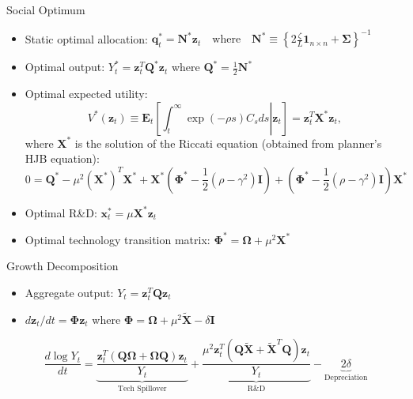 \documentclass[
  10pt,               %
  aspectratio=169,     %
]{beamer}
\theoremstyle{plain}
\begin{document}
\begin{frame}{Social Optimum }

  \label{optimal}
  \begin{itemize}
    \item Static optimal allocation: $\bm{q}_{t}^{*}=\bm{N}^{*}\bm{z}_{t}\quad\text{where}\quad \bm{N}^{*}\equiv\left\{ 2\frac{\zeta}{L}\bm{1}_{n\times n}+\bm{\Sigma}\right\} ^{-1}$
    \item Optimal output: $Y_{t}^{*}=\bm{z}_{t}^{T}\bm{Q}^{*}\bm{z}_{t}$
          where $\bm{Q}^{*}=\frac{1}{2}\bm{N}^{*}$
    \item Optimal expected utility:
          \[
            V^{*}\left(\bm{z}_{t}\right)\equiv\bm{E}_{t}\left[\left.\int_{t}^{\infty}\exp\left(-\rho s\right)C_{s}ds\right|\bm{z}_{t}\right]=\bm{z}_{t}^{T}\bm{X}^{*}\bm{z}_{t},
          \]
          where $\bm{X}^{*}$ is the solution of the Riccati equation (obtained
          from planner's HJB equation):
          \[
            0=\bm{Q}^{*}-\mu^{2}(\bm{X}^*)^T\bm{X}^*+\bm{X}^{*}\left(\bm{\Phi}^{*}-\frac{1}{2}\left(\rho-\gamma^{2}\right)\bm{I}\right)+\left(\bm{\Phi}^{*}-\frac{1}{2}\left(\rho-\gamma^{2}\right)\bm{I}\right)\bm{X}^{*}
          \]
    \item Optimal R\&D: $\bm{x}_{t}^{*}=\mu\bm{X}^{*}\bm{z}_{t}$
    \item Optimal technology transition matrix: $\bm{\Phi}^{*}=\bm{\Omega}+\mu^{2}\bm{X}^{*}$
  \end{itemize}
  \hyperlink{aggregation}{}
\end{frame}

\begin{frame}{Growth Decomposition}
  \begin{itemize}
    \item Aggregate output: $Y_{t}=\bm{z}_{t}^{T}\bm{Q}\bm{z}_{t}$
    \item $d\bm{z}_{t}/dt= \bm{\Phi}\bm{z}_{t}$ where $\bm{\Phi}=\bm{\Omega}+\mu^{2}\bm{\widetilde{X}} - \delta\bm{I}$
  \end{itemize}
  \begin{equation*}
    \frac{d\log Y_{t}}{dt} = \underbrace{\frac{\bm{z}_{t}^{T}\left(\bm{Q}\bm{\Omega}+\bm{\Omega}\bm{Q}\right)\bm{z}_{t}}{Y_{t}}}_{\text{Tech Spillover}} + \underbrace{\frac{\mu^{2}\bm{z}_{t}^{T}\left(\bm{Q}\bm{\widetilde{X}}+\bm{\widetilde{X}}^{T}\bm{Q}\right)\bm{z}_{t}}{Y_{t}}}_{\text{R\&D}} - \underbrace{2\delta}_{\text{Depreciation}}
  \end{equation*}
\end{frame}
\end{document}
